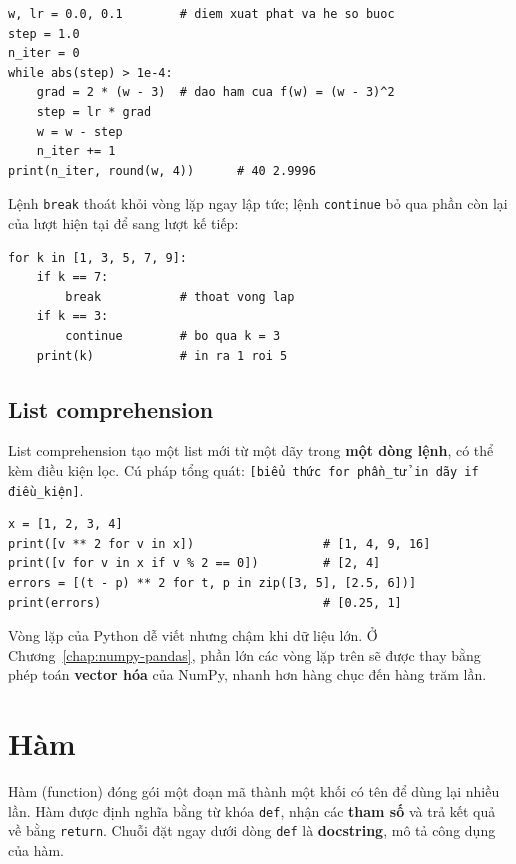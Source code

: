 \begin{lstlisting}[caption={Vòng lặp while: lặp đến khi hội tụ}]
w, lr = 0.0, 0.1        # diem xuat phat va he so buoc
step = 1.0
n_iter = 0
while abs(step) > 1e-4:
    grad = 2 * (w - 3)  # dao ham cua f(w) = (w - 3)^2
    step = lr * grad
    w = w - step
    n_iter += 1
print(n_iter, round(w, 4))      # 40 2.9996
\end{lstlisting}

\noindent Lệnh \texttt{break} thoát khỏi vòng lặp ngay lập tức; lệnh \texttt{continue} bỏ qua phần còn lại của lượt hiện tại để sang lượt kế tiếp:

\begin{lstlisting}[caption={Điều khiển vòng lặp bằng break và continue}]
for k in [1, 3, 5, 7, 9]:
    if k == 7:
        break           # thoat vong lap
    if k == 3:
        continue        # bo qua k = 3
    print(k)            # in ra 1 roi 5
\end{lstlisting}

\subsection{List comprehension}
List comprehension tạo một list mới từ một dãy trong \textbf{một dòng lệnh}, có thể kèm điều kiện lọc. Cú pháp tổng quát: \texttt{[biểu thức for phần\_tử in dãy if điều\_kiện]}.

\begin{lstlisting}[caption={List comprehension}]
x = [1, 2, 3, 4]
print([v ** 2 for v in x])                  # [1, 4, 9, 16]
print([v for v in x if v % 2 == 0])         # [2, 4]
errors = [(t - p) ** 2 for t, p in zip([3, 5], [2.5, 6])]
print(errors)                               # [0.25, 1]
\end{lstlisting}

\noindent Vòng lặp của Python dễ viết nhưng chậm khi dữ liệu lớn. Ở Chương~\ref{chap:numpy-pandas}, phần lớn các vòng lặp trên sẽ được thay bằng phép toán \textbf{vector hóa} của NumPy, nhanh hơn hàng chục đến hàng trăm lần.

\section{Hàm}
\label{sec:python-functions}

Hàm (function) đóng gói một đoạn mã thành một khối có tên để dùng lại nhiều lần. Hàm được định nghĩa bằng từ khóa \texttt{def}, nhận các \textbf{tham số} và trả kết quả về bằng \texttt{return}. Chuỗi đặt ngay dưới dòng \texttt{def} là \textbf{docstring}, mô tả công dụng của hàm.

